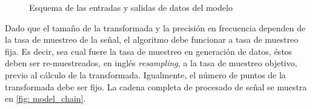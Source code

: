 \begin{figure}[ht!]
{
	}      
	\caption{Esquema de las entradas y salidas de datos del modelo}
	\label{fig: model_schema}
\end{figure}

Dado que el tamaño de la transformada y la precisión en frecuencia dependen de la tasa de muestreo de la señal, el algoritmo debe funcionar a tasa de muestreo fija. Es decir, sea cual fuere la tasa de muestreo en generación de datos, éstos deben ser re-muestreados, en inglés \textit{resampling}, a la tasa de muestreo objetivo, previo al cálculo de la transformada. Igualmente, el número de puntos de la transformada debe ser fijo. La cadena completa de procesado de señal se muestra en \ref{fig: model_chain}.
 
